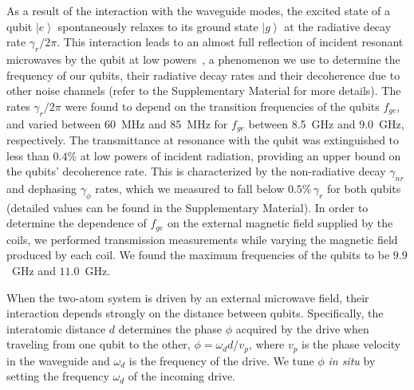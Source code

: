 \documentclass[pra, twocolumn, amsmath, amssymb, notitlepage, longbibliography, showpacs, superscriptaddress]{revtex4-1}
\newcommand{\ket}[1]{\ensuremath{\left|#1\r\rangle}}
\renewcommand{\r}[0]{\right}
\begin{document}
As a result of the interaction with the waveguide modes, the excited state of a qubit $\ket{e}$
spontaneously relaxes to its ground state $\ket{g}$ at the radiative decay rate 
$\gamma_{r}/2\pi$.
This interaction leads to an almost full reflection of incident resonant 
microwaves by the qubit at low powers~\cite{Astafiev2010}, a phenomenon  we use 
to determine the frequency of our qubits, their radiative decay rates and their 
decoherence due to other noise channels (refer to the Supplementary Material
for more details). The rates $\gamma_{r}/2\pi$  were found to 
depend on the transition frequencies of the qubits $f_{ge}$, and varied between 60~MHz and 
85~MHz for $f_{ge}$ between 8.5~GHz and 9.0~GHz, respectively. 
The transmittance at resonance with the qubit was extinguished to less than $0.4\%$ 
at low powers of incident radiation, providing an upper bound on the qubits' decoherence rate. 
This is characterized by the non-radiative decay $\gamma_{nr}$  and 
dephasing $\gamma_\phi$ rates, which we measured to fall below $0.5\%\,\gamma_r$
for both qubits (detailed values can be found in the Supplementary Material). 
In order to determine the dependence of $f_{ge}$ on the external magnetic 
field supplied by the coils, we performed transmission measurements while varying the 
magnetic field produced by each coil. We found the maximum frequencies of the qubits 
to be $9.9$~GHz and $11.0$~GHz. 




When the two-atom system is driven by an external microwave field, 
their interaction depends strongly on the distance between qubits. 
Specifically, the interatomic distance $d$ determines the phase $\phi$ 
acquired by the drive when traveling from one qubit to the other, $\phi=\omega_d d/v_p$,
where $v_p$ is the phase velocity in the waveguide and
$\omega_d$ is the frequency of the drive. 
We tune $\phi$ \emph{in situ} by setting the frequency $\omega_d$ of the incoming drive.
\end{document}
